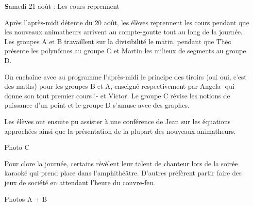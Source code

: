\begin{center}
{\textbf Samedi 21 août : Les cours reprennent}
\end{center}
\vspace{2mm}

Après l’après-midi détente du 20 août, les élèves reprennent les cours pendant que les nouveaux animatheurs arrivent au compte-goutte tout au long de la journée. Les groupes A et B travaillent sur la divisibilité le matin, pendant que Théo présente les polynômes au groupe C et Martin les milieux de segments au groupe D.

On enchaîne avec au programme l’après-midi le principe des tiroirs (oui oui, c’est des maths) pour les groupes B et A, enseigné respectivement par Angela -qui donne son tout premier cours !- et Victor. Le groupe C révise les notions de puissance d’un point et le groupe D s’amuse avec des graphes.

Les élèves ont ensuite pu assister à une conférence de Jean sur les équations approchées ainsi que la présentation de la plupart des nouveaux animatheurs.

Photo C

Pour clore la journée, certains révèlent leur talent de chanteur lors de la soirée karaoké qui prend place dans l’amphithéâtre. D’autres préfèrent partir faire des jeux de société en attendant l’heure du couvre-feu.


Photos A + B
